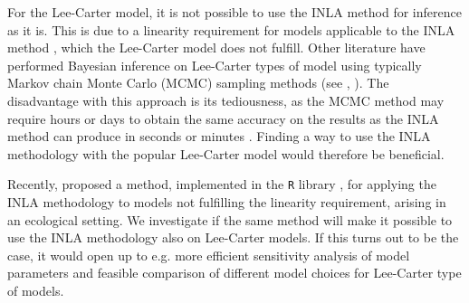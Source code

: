 \newpar For the Lee-Carter model, it is not possible to use the INLA method for inference as it is. This is due to a linearity requirement for models applicable to the INLA method \parencite{martinoRiebler2019}, which the Lee-Carter model does not fulfill. Other literature have performed Bayesian inference on Lee-Carter types of model using typically Markov chain Monte Carlo (MCMC) sampling methods (see \textcite{CZADO2005260}, \textcite{Wisniowski2015}). The disadvantage with this approach is its tediousness, as the MCMC method may require hours or days to obtain the same accuracy on the results as the INLA method can produce in seconds or minutes \parencite{rue2009inla}. Finding a way to use the INLA methodology with the popular Lee-Carter model would therefore be beneficial. 

\newpar Recently, \textcite{BachlLindgren2019} proposed a method, implemented in the \texttt{R} library \inlabru, for applying the INLA methodology to models not fulfilling the linearity requirement, arising in an ecological setting. We investigate if the same method will make it possible to use the INLA methodology also on Lee-Carter models. If this turns out to be the case, it would open up to e.g. more efficient sensitivity analysis of model parameters and feasible comparison of different model choices for Lee-Carter type of models.

